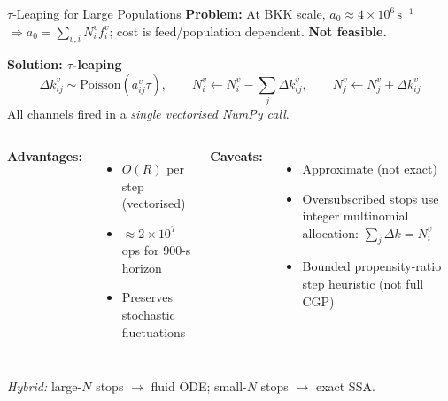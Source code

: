 \documentclass[aspectratio=169,12pt]{beamer}
\begin{document}
\begin{frame}{$\tau$-Leaping for Large Populations}
\textbf{Problem:} At BKK scale, $a_0\approx4\times10^6\,\text{s}^{-1}$
$\Rightarrow a_0=\sum_{v,i}N_i^v f_i^v$; cost is feed/population dependent.
\textcolor{warnred}{\textbf{Not feasible.}}

\vspace{6pt}
\textbf{Solution: $\tau$-leaping} \cite{gillespie2001}
\[
\Delta k^v_{ij}\sim\mathrm{Poisson}(a^v_{ij}\tau), \qquad
N^v_i \leftarrow N^v_i - \textstyle\sum_j\Delta k^v_{ij}, \qquad
N^v_j \leftarrow N^v_j + \Delta k^v_{ij}
\]
All channels fired in a \emph{single vectorised NumPy call}.

\begin{columns}[T]
\textbf{Advantages:}
\begin{itemize}
  \item $O(R)$ per step (vectorised)
  \item $\approx 2\times10^7$ ops for 900-s horizon
  \item Preserves stochastic fluctuations
\end{itemize}

\textbf{Caveats:}
\begin{itemize}
  \item Approximate (not exact)
  \item Oversubscribed stops use integer multinomial allocation:
        $\sum_j\Delta k=N^v_i$
  \item Bounded propensity-ratio step heuristic (not full CGP)
\end{itemize}
\end{columns}
\vspace{4pt}
\textit{Hybrid:} large-$N$ stops $\to$ fluid ODE; small-$N$ stops $\to$ exact SSA.
\end{frame}
\end{document}
